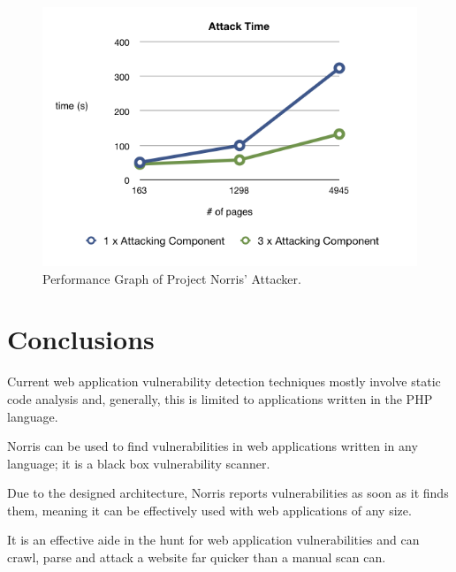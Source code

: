 \documentclass[12pt,a4paper]{article}
\begin{document}
\begin{figure}[!ht]
    \begin{center}
        \includegraphics[scale=0.7]{images/attack_performance.png}    
    \end{center}
    \caption{Performance Graph of Project Norris' Attacker.}
    \label{fig:performance2}
\end{figure}

\section{Conclusions}

Current web application vulnerability detection techniques mostly involve static code analysis and, generally, this is limited to applications written in the PHP language.

Norris can be used to find vulnerabilities in web applications written in any language; it is a black box vulnerability scanner. 

Due to the designed architecture, Norris reports vulnerabilities as soon as it finds them, meaning it can be effectively used with web applications of any size.

It is an effective aide in the hunt for web application vulnerabilities and can crawl, parse and attack a website far quicker than a manual scan can.


\end{document}

